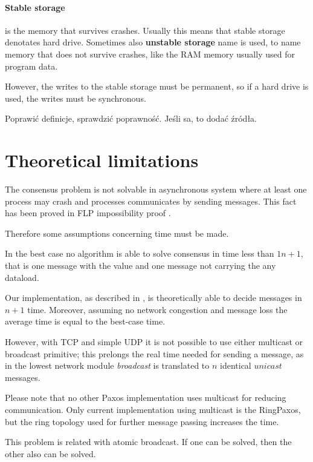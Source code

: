 \paragraph{Stable storage}
is the memory that survives crashes. Usually this means that stable storage denotates hard drive.
Sometimes also \textbf{unstable storage} name is used, to name memory that does not survive crashes, like the RAM memory usually used for program data.

However, the writes to the stable storage must be permanent, so if a hard drive is used, the writes must be synchronous.

\begin{TODO}
 Poprawić definicje, sprawdzić poprawność. Jeśli sa, to dodać źródła.
\end{TODO}

\section{Theoretical limitations}


The consensus problem is not solvable in asynchronous system where at least one process may crash and processes communicates by sending messages. This fact has been proved in FLP impossibility proof \cite{FLP}.

Therefore some assumptions concerning time must be made.


In the best case no algorithm is able to solve consensus in time less than $1n+1$, that is one message with the value and one message not carrying the any dataload.

Our implementation, as described in %
, is theoretically able to decide messages in $n+1$ time. Moreover, assuming no network congestion and message loss the average time is equal to the best-case time.

However, with TCP and simple UDP it is not possible to use either multicast or broadcast primitive; this prelongs the real time needed for sending a message, as in the lowest network module \emph{broadcast} is translated to $n$ identical $unicast$ messages.

Please note that no other Paxos implementation uses multicast for reducing communication. Only current implementation using multicast is the RingPaxos\cite{Mar10}, but the ring topology used for further message passing increases the time.


\begin{TODO}
 This problem is related with atomic broadcast. If one can be solved, then the other also can be solved.
\end{TODO}


